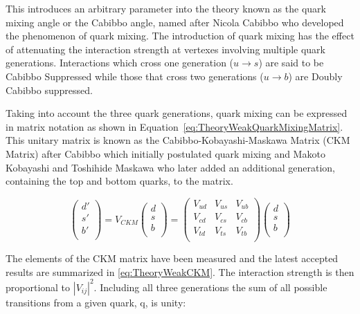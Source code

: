 This introduces an arbitrary parameter into the theory known as the quark mixing angle or the Cabibbo angle, named after Nicola Cabibbo who developed the phenomenon of quark mixing. The introduction of quark mixing has the effect of attenuating the interaction strength at vertexes involving multiple quark generations. Interactions which cross one generation ($u\rightarrow s$) are said to be Cabibbo Suppressed while those that cross two generations ($u\rightarrow b$) are Doubly Cabibbo suppressed.

Taking into account the three quark generations, quark mixing can be expressed in matrix notation as shown in Equation~\ref{eq:TheoryWeakQuarkMixingMatrix}. This unitary matrix is known as the Cabibbo-Kobayashi-Maskawa Matrix (CKM Matrix) after Cabibbo which initially postulated quark mixing and Makoto Kobayashi and Toshihide Maskawa who later added an additional generation, containing the top and bottom quarks, to the matrix.

\begin{equation}
\label{eq:TheoryWeakQuarkMixingMatrix}
\begin{pmatrix}
  d' \\
  s' \\
  b' \\
\end{pmatrix}
=
V_{CKM}
\begin{pmatrix}
  d \\
  s \\
  b \\
\end{pmatrix}
=
\begin{pmatrix}
  V_{ud} & V_{us} & V_{ub} \\
  V_{cd} & V_{cs} & V_{cb} \\
  V_{td} & V_{ts} & V_{tb} \\
\end{pmatrix}
\begin{pmatrix}
  d \\
  s \\
  b \\
\end{pmatrix}
\end{equation}

The elements of the CKM matrix have been measured and the latest accepted results are summarized in \ref{eq:TheoryWeakCKM}. The interaction strength is then proportional to $|V_{ij}|^{2}$. Including all three generations the sum of all possible transitions from a given quark, q, is unity:


